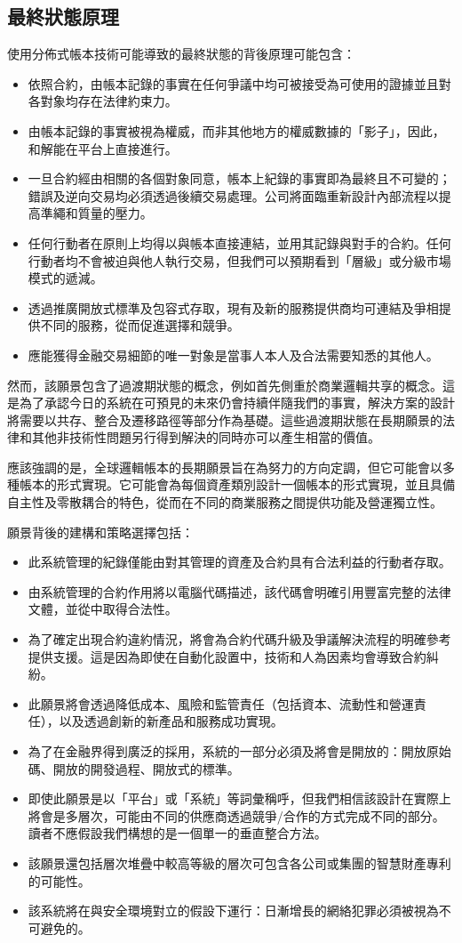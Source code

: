 \documentclass[UTF8]{ctexart}
\begin{document}
\subsection{最終狀態原理}
使用分佈式帳本技術可能導致的最終狀態的背後原理可能包含：
\begin{itemize}
	\item 依照合約，由帳本記錄的事實在任何爭議中均可被接受為可使用的證據並且對各對象均存在法律約束力。
	\item 由帳本記錄的事實被視為權威，而非其他地方的權威數據的「影子」，因此，和解能在平台上直接進行。
	\item 一旦合約經由相關的各個對象同意，帳本上紀錄的事實即為最終且不可變的；錯誤及逆向交易均必須透過後續交易處理。公司將面臨重新設計內部流程以提高準繩和質量的壓力。
	\item 任何行動者在原則上均得以與帳本直接連結，並用其記錄與對手的合約。任何行動者均不會被迫與他人執行交易，但我們可以預期看到「層級」或分級市場模式的遞減。 
	\item 透過推廣開放式標準及包容式存取，現有及新的服務提供商均可連結及爭相提供不同的服務，從而促進選擇和競爭。
	\item 應能獲得金融交易細節的唯一對象是當事人本人及合法需要知悉的其他人。
\end{itemize}

然而，該願景包含了過渡期狀態的概念，例如首先側重於商業邏輯共享的概念。這是為了承認今日的系統在可預見的未來仍會持續伴隨我們的事實，解決方案的設計將需要以共存、整合及遷移路徑等部分作為基礎。這些過渡期狀態在長期願景的法律和其他非技術性問題另行得到解決的同時亦可以產生相當的價值。

應該強調的是，全球邏輯帳本的長期願景旨在為努力的方向定調，但它可能會以多種帳本的形式實現。它可能會為每個資產類別設計一個帳本的形式實現，並且具備自主性及零散耦合的特色，從而在不同的商業服務之間提供功能及營運獨立性。 

願景背後的建構和策略選擇包括：
\begin{itemize} 
\item 此系統管理的紀錄僅能由對其管理的資產及合約具有合法利益的行動者存取。
\item 由系統管理的合約作用將以電腦代碼描述，該代碼會明確引用豐富完整的法律文體，並從中取得合法性。\cite{Ricardian}
\item 為了確定出現合約違約情況，將會為合約代碼升級及爭議解決流程的明確參考提供支援。這是因為即使在自動化設置中，技術和人為因素均會導致合約糾紛。 
\item 此願景將會透過降低成本、風險和監管責任（包括資本、流動性和營運責任），以及透過創新的新產品和服務成功實現。
\item 為了在金融界得到廣泛的採用，系統的一部分必須及將會是開放的：開放原始碼、開放的開發過程、開放式的標準。
\item 即使此願景是以「平台」或「系統」等詞彙稱呼，但我們相信該設計在實際上將會是多層次，可能由不同的供應商透過競爭/合作的方式完成不同的部分。讀者不應假設我們構想的是一個單一的垂直整合方法。
\item 該願景還包括層次堆疊中較高等級的層次可包含各公司或集團的智慧財產專利的可能性。
\item 該系統將在與安全環境對立的假設下運行：日漸增長的網絡犯罪必須被視為不可避免的。
\end{itemize}
\end{document}

